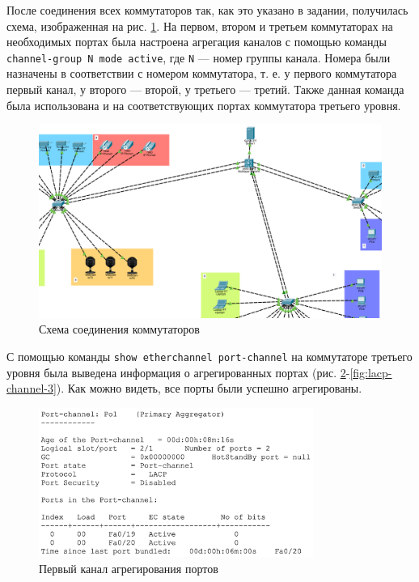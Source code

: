 \documentclass[a4paper, 14pt]{extarticle}
\begin{document}
После соединения всех коммутаторов так, как это указано в задании, получилась
схема, изображенная на рис. \ref{fig:lacp-scheme}. На первом, втором и третьем
коммутаторах на необходимых портах была настроена агрегация каналов с помощью
команды \texttt{channel-group N mode active}, где \texttt{N} --- номер группы
канала. Номера были назначены в соответствии с номером коммутатора, т. е. у
первого коммутатора первый канал, у второго --- второй, у третьего --- третий.
Также данная команда была использована и на соответствующих портах коммутатора
третьего уровня.

\begin{figure}[H]
  \centering
  \includegraphics[width=\textwidth]{images/lacp/scheme.png}
  \caption{Схема соединения коммутаторов}
  \label{fig:lacp-scheme}
\end{figure}

С помощью команды \texttt{show etherchannel port-channel} на коммутаторе
третьего уровня была выведена информация о агрегированных портах (рис.
\ref{fig:lacp-channel-1}-\ref{fig:lacp-channel-3}). Как можно видеть, все
порты были успешно агрегированы.

\begin{figure}[H]
  \centering
  \includegraphics[width=0.8\textwidth]{images/lacp/channel-1.png}
  \caption{Первый канал агрегирования портов}
  \label{fig:lacp-channel-1}
\end{figure}
\end{document}
